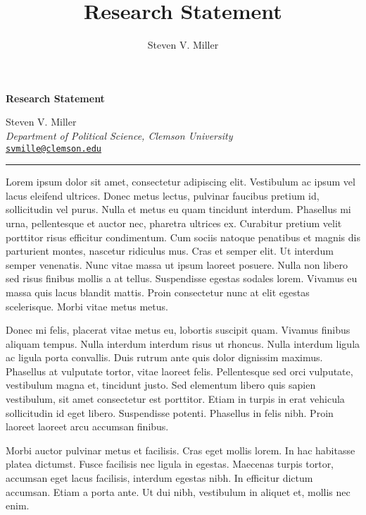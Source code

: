 \documentclass[11pt,]{article}
\title{Research Statement}
\author{Steven V. Miller}
\date{}
\newcommand{\blankline}{\quad\pagebreak[2]}
\begin{document}
  



\thispagestyle{plain} 

\begin{flushleft}\Large \bf Research Statement  \end{flushleft}
	\vspace{1 mm}   
Steven V. Miller \\
\emph{Department of Political Science, Clemson University} \\
\texttt{\href{mailto:svmille@clemson.edu}{\nolinkurl{svmille@clemson.edu}}}   \\

  

\hrule

\vspace{6 mm}
	


Lorem ipsum dolor sit amet, consectetur adipiscing elit. Vestibulum ac
ipsum vel lacus eleifend ultrices. Donec metus lectus, pulvinar faucibus
pretium id, sollicitudin vel purus. Nulla et metus eu quam tincidunt
interdum. Phasellus mi urna, pellentesque et auctor nec, pharetra
ultrices ex. Curabitur pretium velit porttitor risus efficitur
condimentum. Cum sociis natoque penatibus et magnis dis parturient
montes, nascetur ridiculus mus. Cras et semper elit. Ut interdum semper
venenatis. Nunc vitae massa ut ipsum laoreet posuere. Nulla non libero
sed risus finibus mollis a at tellus. Suspendisse egestas sodales lorem.
Vivamus eu massa quis lacus blandit mattis. Proin consectetur nunc at
elit egestas scelerisque. Morbi vitae metus metus.

Donec mi felis, placerat vitae metus eu, lobortis suscipit quam. Vivamus
finibus aliquam tempus. Nulla interdum interdum risus ut rhoncus. Nulla
interdum ligula ac ligula porta convallis. Duis rutrum ante quis dolor
dignissim maximus. Phasellus at vulputate tortor, vitae laoreet felis.
Pellentesque sed orci vulputate, vestibulum magna et, tincidunt justo.
Sed elementum libero quis sapien vestibulum, sit amet consectetur est
porttitor. Etiam in turpis in erat vehicula sollicitudin id eget libero.
Suspendisse potenti. Phasellus in felis nibh. Proin laoreet laoreet arcu
accumsan finibus.

Morbi auctor pulvinar metus et facilisis. Cras eget mollis lorem. In hac
habitasse platea dictumst. Fusce facilisis nec ligula in egestas.
Maecenas turpis tortor, accumsan eget lacus facilisis, interdum egestas
nibh. In efficitur dictum accumsan. Etiam a porta ante. Ut dui nibh,
vestibulum in aliquet et, mollis nec enim.
\end{document}

